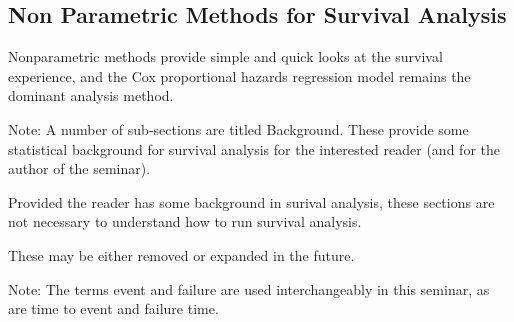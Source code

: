 \documentclass[]{beamer}
\begin{document}
\subsection*{Non Parametric Methods for Survival Analysis}
\begin{frame}
Nonparametric methods provide simple and quick looks at the survival experience, and the Cox proportional hazards regression model remains the dominant analysis method. 



Note: A number of sub-sections are titled Background. 
These provide some statistical background for survival analysis for the interested reader (and for the author of the seminar). 

Provided the reader has some background in surival analysis, these sections are not necessary to understand how to run survival analysis. 

These may be either removed or expanded in the future.

Note: The terms event and failure are used interchangeably in this seminar, as are time to event and failure time.
\end{frame}
%
%
\end{document}
